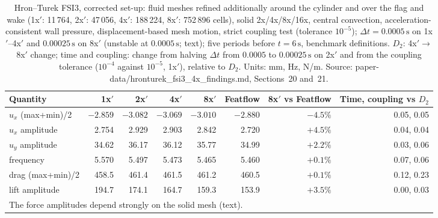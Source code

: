 \begin{table}[htbp]
	\centering
	\small
	\setlength{\tabcolsep}{3pt}
	\caption{Hron--Turek FSI3, corrected set-up: fluid meshes refined additionally around the cylinder and over the flag and wake (1x$'$: 11\,764, 2x$'$: 47\,056, 4x$'$: 188\,224, 8x$'$: 752\,896 cells), solid 2x/4x/8x/16x, central convection, acceleration-consistent wall pressure, displacement-based mesh motion, strict coupling test (tolerance $10^{-5}$); $\Delta t = 0.0005\,\mathrm{s}$ on 1x$'$--4x$'$ and $0.00025\,\mathrm{s}$ on 8x$'$ (unstable at $0.0005\,\mathrm{s}$; text); five periods before $t = 6\,\mathrm{s}$, benchmark definitions. $D_2$: 4x$'\to$8x$'$ change; time and coupling: change from halving $\Delta t$ from $0.0005$ to $0.00025\,\mathrm{s}$ on 2x$'$ and from the coupling tolerance ($10^{-4}$ against $10^{-5}$, 1x$'$), relative to $D_2$. Units: mm, Hz, N/m. Source: paper-data/hronturek\_fsi3\_4x\_findings.md, Sections~20 and~21.}
	\label{tab:hronturek_corrected}
	\begin{tabular}{lrrrrrrr}
		\toprule
		Quantity & 1x$'$ & 2x$'$ & 4x$'$ & 8x$'$ & Featflow & 8x$'$ vs Featflow & Time, coupling vs $D_2$ \\
		\midrule
		$u_x$ (max+min)/2 & $-2.859$ & $-3.082$ & $-3.069$ & $-3.010$ & $-2.880$ & $-4.5\%$ & 0.05, 0.05 \\
		$u_x$ amplitude & 2.754 & 2.929 & 2.903 & 2.842 & 2.720 & $+4.5\%$ & 0.04, 0.04 \\
		$u_y$ amplitude & 34.62 & 36.17 & 36.12 & 35.77 & 34.99 & $+2.2\%$ & 0.03, 0.06 \\
		frequency & 5.570 & 5.497 & 5.473 & 5.465 & 5.460 & $+0.1\%$ & 0.07, 0.06 \\
		drag (max+min)/2 & 458.5 & 461.4 & 461.5 & 461.2 & 460.5 & $+0.1\%$ & 0.12, 0.23 \\
		lift amplitude & 194.7 & 174.1 & 164.7 & 159.3 & 153.9 & $+3.5\%$ & 0.00, 0.03 \\
		\bottomrule
		\multicolumn{8}{l}{\footnotesize The force amplitudes depend strongly on the solid mesh (text).}
	\end{tabular}
\end{table}

